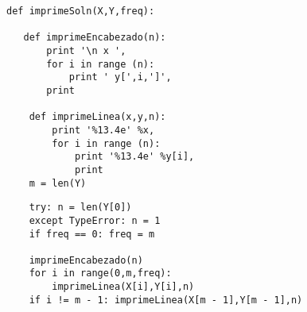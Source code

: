 \begin{frame}[fragile]
\begin{lstlisting}
def imprimeSoln(X,Y,freq):
   
   def imprimeEncabezado(n):
       print '\n x ',
       for i in range (n):
           print ' y[',i,']',
       print
    
    def imprimeLinea(x,y,n):
        print '%13.4e' %x,
        for i in range (n):
            print '%13.4e' %y[i],
            print
    m = len(Y)
\end{lstlisting}
\end{frame}
\begin{frame}[fragile]
\begin{lstlisting}
    try: n = len(Y[0])
    except TypeError: n = 1
    if freq == 0: freq = m

    imprimeEncabezado(n)
    for i in range(0,m,freq):
        imprimeLinea(X[i],Y[i],n)
    if i != m - 1: imprimeLinea(X[m - 1],Y[m - 1],n)
\end{lstlisting}
\end{frame}

